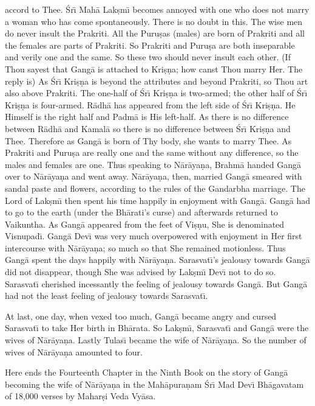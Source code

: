 accord to Thee. \'Sr\={\i} Mah\=a Lak\d{s}m\={\i} becomes annoyed with one who does not marry a woman who has come spontaneously. There is no doubt in this. The wise men do never insult the Prakriti. All the Puru\d{s}as (males) are born of Prakriti and all the females are parts of Prakriti. So Prakriti and Puru\d{s}a are both inseparable and verily one and the same. So these two should never insult each other. (If Thou sayest that Gang\=a is attached to Kri\d{s}\d{n}a; how canst Thou marry Her. The reply is) As \'Sr\={\i} Kri\d{s}\d{n}a is beyond the attributes and beyond Prakriti, so Thou art also above Prakriti. The one-half of \'Sr\={\i} Kri\d{s}\d{n}a is two-armed; the other half of \'Sr\={\i} Kri\d{s}\d{n}a is four-armed. R\=adh\=a has appeared from the left side of \'Sr\={\i} Kri\d{s}\d{n}a. He Himself is the right half and Padm\=a is His left-half. As there is no difference between R\=adh\=a and Kamal\=a so there is no difference between \'Sr\={\i} Kri\d{s}\d{n}a and Thee. Therefore as Gang\=a is born of Thy body, she wants to marry Thee. As Prakriti and Puru\d{s}a are really one and the same without any difference, so the males and females are one. Thus speaking to N\=ar\=aya\d{n}a, Brahm\=a handed Gang\=a over to N\=ar\=aya\d{n}a and went away. N\=ar\=aya\d{n}a, then, married Gang\=a smeared with sandal paste and flowers, according to the rules of the Gandarbha marriage. The Lord of Lak\d{s}m\={\i} then spent his time happily in enjoyment with Gang\=a. Gang\=a had to go to the earth (under the Bh\=arati's curse) and afterwards returned to Vaikuntha. As Gang\=a appeared from the feet of Vi\d{s}\d{n}u, She is denominated Visnupad\={\i}. Gang\=a Dev\={\i} was very much overpowered with enjoyment in Her first intercourse with N\=ar\=aya\d{n}a; so much so that She remained motionless. Thus Gang\=a spent the days happily with N\=ar\=aya\d{n}a. Sarasvat\={\i}'s jealousy towards Gang\=a did not disappear, though She was advised by Lak\d{s}m\={\i} Dev\={\i} not to do so. Sarasvat\={\i} cherished incessantly the feeling of jealousy towards Gang\=a. But Gang\=a had not the least feeling of jealousy towards Sarasvat\={\i}.

At last, one day, when vexed too much, Gang\=a became angry and cursed Sarasvat\={\i} to take Her birth in Bh\=arata. So Lak\d{s}m\={\i}, Sarasvat\={\i} and Gang\=a were the wives of N\=ar\=aya\d{n}a. Lastly Tulas\={\i} became the wife of N\=ar\=aya\d{n}a. So the number of wives of N\=ar\=aya\d{n}a amounted to four.

Here ends the Fourteenth Chapter in the Ninth Book on the story of Gang\=a becoming the wife of N\=ar\=aya\d{n}a in the Mah\=apura\d{n}am \'Sr\={\i} Mad Dev\={\i} Bh\=agavatam of 18,000 verses by Mahar\d{s}i Veda Vy\=asa.



